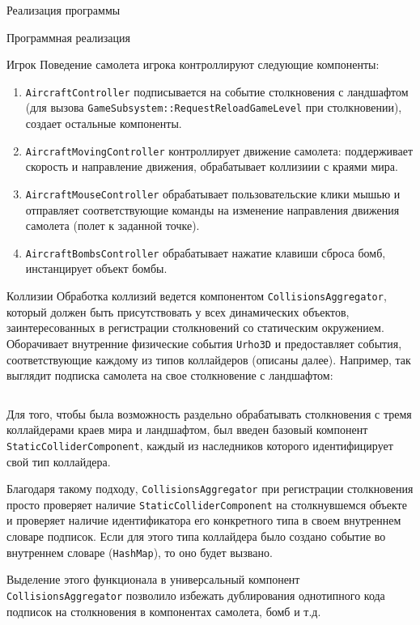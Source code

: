 \documentclass[a4paper, 14pt]{extarticle}
\begin{document}
\begin{section}{Реализация программы}
\begin{subsection}{Программная реализация}
\begin{subsubsection}{Игрок}
Поведение самолета игрока контроллируют следующие компоненты:
\begin{enumerate}
\item \verb|AircraftController| подписывается на событие столкновения с ландшафтом (для вызова \verb|GameSubsystem::RequestReloadGameLevel| при столкновении), создает остальные компоненты.
\item \verb|AircraftMovingController| контроллирует движение самолета: поддерживает скорость и направление движения, обрабатывает коллизиии с краями мира.
\item \verb|AircraftMouseController| обрабатывает пользовательские клики мышью и отправляет соответствующие команды на изменение направления движения самолета (полет к заданной точке).
\item \verb|AircraftBombsController| обрабатывает нажатие клавиши сброса бомб, инстанцирует объект бомбы.
\end{enumerate}
\end{subsubsection}

\clearpage
\begin{subsubsection}{Коллизии}
Обработка коллизий ведется компонентом \verb|CollisionsAggregator|, который должен быть присутствовать у всех динамических объектов, заинтересованных в регистрации столкновений со статическим окружением.
Оборачивает внутренние физические события \verb|Urho3D| и предоставляет события, соответствующие каждому из типов коллайдеров (описаны далее).
Например, так выглядит подписка самолета на свое столкновение с ландшафтом:

\inputminted{cpp}{listings/AircraftCollisionExample.cpp}

Для того, чтобы была возможность раздельно обрабатывать столкновения с тремя коллайдерами краев мира и ландшафтом, был введен базовый компонент \verb|StaticColliderComponent|, каждый из наследников которого идентифицирует свой тип коллайдера.

Благодаря такому подходу, \verb|CollisionsAggregator| при регистрации столкновения просто проверяет наличие \verb|StaticColliderComponent| на столкнувшемся объекте и проверяет наличие идентификатора его конкретного типа в своем внутреннем словаре подписок.
Если для этого типа коллайдера было создано событие во внутреннем словаре (\verb|HashMap|), то оно будет вызвано.

Выделение этого функционала в универсальный компонент \verb|CollisionsAggregator| позволило избежать дублирования однотипного кода подписок на столкновения в компонентах самолета, бомб и т.д.
\end{subsubsection}


\end{subsection}
\end{section}
\end{document}
